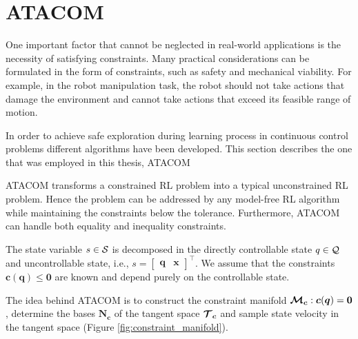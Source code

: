 
\section{ATACOM}
\label{sec:atacom}
One important factor that cannot be neglected in real-world applications is the necessity of satisfying constraints.
Many practical considerations can be formulated in the form of constraints, such as safety and mechanical viability. For example,
in the robot manipulation task, the robot should not take actions that damage the environment and cannot take actions that exceed
its feasible range of motion.

In order to achieve safe exploration during learning process in continuous control problems different algorithms have been developed.
This section describes the one that was employed in this thesis, ATACOM \cite{Atacom}
 
ATACOM transforms a constrained RL problem into a typical unconstrained RL problem. Hence the problem can be addressed by any
model-free RL algorithm while maintaining the constraints below the tolerance. Furthermore, ATACOM can handle both equality and inequality
constraints.

The state variable $s \in \mathcal{S}$ is decomposed in the directly controllable state $q \in \mathcal{Q}$ and uncontrollable state, i.e., $s = \left[\begin{smallmatrix} \bm{q} & \bm{x}\end{smallmatrix}\right]^\intercal$.
We assume that the constraints $\bm{c}(\bm{q}) \le \bm{0}$ are known and depend purely on the controllable state. 

The idea behind ATACOM is to construct the constraint manifold $\bm{\mathcal{M}_c} : \bm{c}(\bm{q}) = \bm{0}$, determine the bases $\bm{N_c}$ of the tangent space $\bm{\mathcal{T}_c}$
and sample state velocity in the tangent space (Figure \ref{fig:constraint_manifold}).

